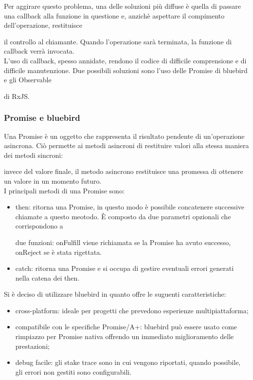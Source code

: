 Per aggirare questo problema, una delle soluzioni più diffuse è quella di passare una callback alla funzione in questione e, anzichè aspettare il compimento dell'operazione, restituisce

il controllo al chiamante. Quando l'operazione sarà terminata, la funzione di callback verrà invocata. \\


L'uso di callback, spesso annidate, rendono il codice di difficile comprensione e di difficile manutenzione. Due possibili soluzioni sono l'uso delle Promise di bluebird e gli Observable

di RxJS.


\subsubsection{Promise e bluebird}


Una Promise è un oggetto che rappresenta il risultato pendente di un’operazione asincrona. Ciò permette ai metodi asincroni di restituire valori alla stessa maniera dei metodi sincroni:

invece del valore finale, il metodo asincrono restituisce una promessa di ottenere un valore in un momento futuro. \\

I principali metodi di una Promise sono:

\begin{itemize}

\item then: ritorna una Promise, in questo modo è possibile concatenere successive chiamate a questo meotodo. È composto da due parametri opzionali che corrispondono a 

due funzioni: onFulfill viene richiamata se la Promise ha avuto successo, onReject se è stata rigettata.  

\item catch: ritorna una Promise e si occupa di gestire eventuali errori generati nella catena dei then.

\end{itemize}


Si è deciso di utilizzare bluebird in quanto offre le suguenti caratteristiche:

\begin{itemize}

\item cross-platform: ideale per progetti che prevedono esperienze multipiattaforma;

\item compatibile con le specifiche Promise/A+: bluebird può essere usato come rimpiazzo per Promise nativa offrendo un immediato miglioramento delle prestazioni;

\item debug facile: gli stake trace sono in cui vengono riportati, quando possibile, gli errori non gestiti sono configurabili.

\end{itemize}



